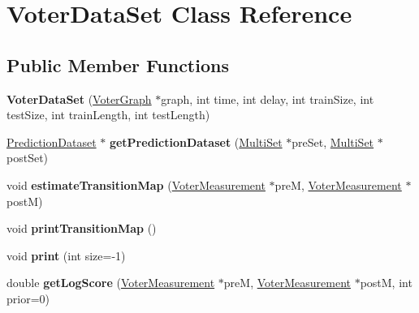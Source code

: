 \hypertarget{classVoterDataSet}{\section{Voter\-Data\-Set Class Reference}
\label{classVoterDataSet}
}
\subsection*{Public Member Functions}
\begin{DoxyCompactItemize}
\item 
\hypertarget{classVoterDataSet_a85862f252fad49f884e47db2f5a5674c}{{\bfseries Voter\-Data\-Set} (\hyperlink{classVoterGraph}{Voter\-Graph} $\ast$graph, int time, int delay, int train\-Size, int test\-Size, int train\-Length, int test\-Length)}\label{classVoterDataSet_a85862f252fad49f884e47db2f5a5674c}

\item 
\hypertarget{classVoterDataSet_adcfbf83886552504da000223c188d8a8}{\hyperlink{classPredictionDataset}{Prediction\-Dataset} $\ast$ {\bfseries get\-Prediction\-Dataset} (\hyperlink{classMultiSet}{Multi\-Set} $\ast$pre\-Set, \hyperlink{classMultiSet}{Multi\-Set} $\ast$post\-Set)}\label{classVoterDataSet_adcfbf83886552504da000223c188d8a8}

\item 
\hypertarget{classVoterDataSet_af70ae2bf803da48a2d9e8d63fe3ff734}{void {\bfseries estimate\-Transition\-Map} (\hyperlink{classVoterMeasurement}{Voter\-Measurement} $\ast$pre\-M, \hyperlink{classVoterMeasurement}{Voter\-Measurement} $\ast$post\-M)}\label{classVoterDataSet_af70ae2bf803da48a2d9e8d63fe3ff734}

\item 
\hypertarget{classVoterDataSet_ad012aba1d9993327593f7cddc325d51c}{void {\bfseries print\-Transition\-Map} ()}\label{classVoterDataSet_ad012aba1d9993327593f7cddc325d51c}

\item 
\hypertarget{classVoterDataSet_ad089568197304bede968974c3d2d9f30}{void {\bfseries print} (int size=-\/1)}\label{classVoterDataSet_ad089568197304bede968974c3d2d9f30}

\item 
\hypertarget{classVoterDataSet_a2a979b77b09ed30a92335423ebe21d12}{double {\bfseries get\-Log\-Score} (\hyperlink{classVoterMeasurement}{Voter\-Measurement} $\ast$pre\-M, \hyperlink{classVoterMeasurement}{Voter\-Measurement} $\ast$post\-M, int prior=0)}\label{classVoterDataSet_a2a979b77b09ed30a92335423ebe21d12}


\end{DoxyCompactItemize}
